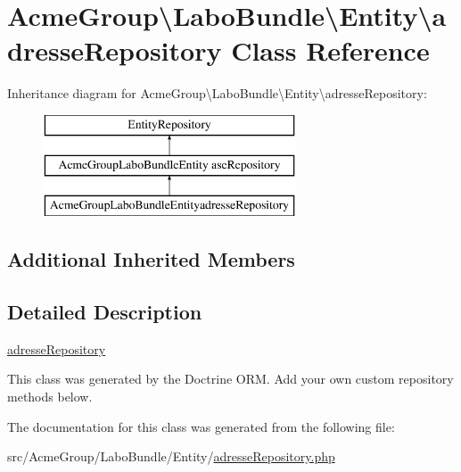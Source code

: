 \hypertarget{class_acme_group_1_1_labo_bundle_1_1_entity_1_1adresse_repository}{\section{Acme\+Group\textbackslash{}Labo\+Bundle\textbackslash{}Entity\textbackslash{}adresse\+Repository Class Reference}
\label{class_acme_group_1_1_labo_bundle_1_1_entity_1_1adresse_repository}
}
Inheritance diagram for Acme\+Group\textbackslash{}Labo\+Bundle\textbackslash{}Entity\textbackslash{}adresse\+Repository\+:\begin{figure}[H]
\begin{center}
\leavevmode
\includegraphics[height=3.000000cm]{class_acme_group_1_1_labo_bundle_1_1_entity_1_1adresse_repository}
\end{center}
\end{figure}
\subsection*{Additional Inherited Members}


\subsection{Detailed Description}
\hyperlink{class_acme_group_1_1_labo_bundle_1_1_entity_1_1adresse_repository}{adresse\+Repository}

This class was generated by the Doctrine O\+R\+M. Add your own custom repository methods below. 

The documentation for this class was generated from the following file\+:\begin{DoxyCompactItemize}
\item 
src/\+Acme\+Group/\+Labo\+Bundle/\+Entity/\hyperlink{adresse_repository_8php}{adresse\+Repository.\+php}\end{DoxyCompactItemize}
